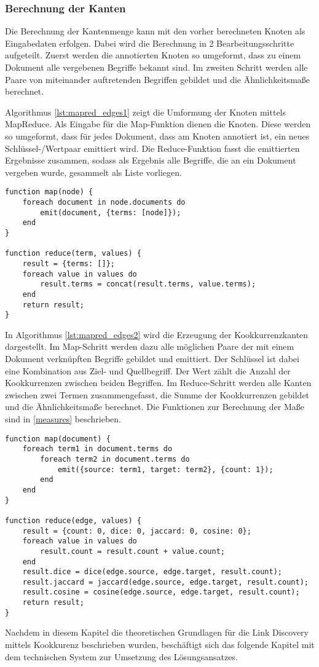 \subsubsection{Berechnung der Kanten}

Die Berechnung der Kantenmenge kann mit den vorher berechneten Knoten als Eingabedaten erfolgen. Dabei wird die Berechnung in 2 Bearbeitungsschritte aufgeteilt. Zuerst werden die annotierten Knoten so umgeformt, dass zu einem Dokument alle vergebenen Begriffe bekannt sind. Im zweiten Schritt werden alle Paare von miteinander auftretenden Begriffen gebildet und die Ähnlichkeitsmaße berechnet.

Algorithmus \ref{lst:mapred_edges1} zeigt die Umformung der Knoten mittels MapReduce. Als Eingabe für die Map-Funktion dienen die Knoten. Diese werden so umgeformt, dass für jedes Dokument, dass am Knoten annotiert ist, ein neues Schlüssel-/Wertpaar emittiert wird. Die Reduce-Funktion fasst die emittierten Ergebnisse zusammen, sodass als Ergebnis alle Begriffe, die an ein Dokument vergeben wurde, gesammelt als Liste vorliegen.

\begin{lstlisting}[language=pseudo, label={lst:mapred_edges1}, caption={Umformung der Knoten mit MapReduce}]
function map(node) {
    foreach document in node.documents do
        emit(document, {terms: [node]});
    end
}

function reduce(term, values) {
    result = {terms: []};
    foreach value in values do
        result.terms = concat(result.terms, value.terms);
    end
    return result;
}
\end{lstlisting}

In Algorithmus \ref{lst:mapred_edges2} wird die Erzeugung der Kookkurrenzkanten dargestellt. Im Map-Schritt werden dazu alle möglichen Paare der mit einem Dokument verknüpften Begriffe gebildet und emittiert. Der Schlüssel ist dabei eine Kombination aus Ziel- und Quellbegriff. Der Wert zählt die Anzahl der Kookkurrenzen zwischen beiden Begriffen. Im Reduce-Schritt werden alle Kanten zwischen zwei Termen zusammengefasst, die Summe der Kookkurrenzen gebildet und die Ähnlichkeitsmaße berechnet. Die Funktionen zur Berechnung der Maße sind in \ref{measures} beschrieben.

\begin{lstlisting}[language=pseudo, label={lst:mapred_edges2}, caption={Kantenerzeugung mit MapReduce}]
function map(document) {
    foreach term1 in document.terms do
        foreach term2 in document.terms do
            emit({source: term1, target: term2}, {count: 1});
        end
    end
}

function reduce(edge, values) {
    result = {count: 0, dice: 0, jaccard: 0, cosine: 0};
    foreach value in values do
        result.count = result.count + value.count;
    end
    result.dice = dice(edge.source, edge.target, result.count);
    result.jaccard = jaccard(edge.source, edge.target, result.count);
    result.cosine = cosine(edge.source, edge.target, result.count);
    return result;
}
\end{lstlisting}

Nachdem in diesem Kapitel die theoretischen Grundlagen für die Link Discovery mittels Kookkurenz beschrieben wurden, beschäftigt sich das folgende Kapitel mit dem technischen System zur Umsetzung des Lösungsansatzes.